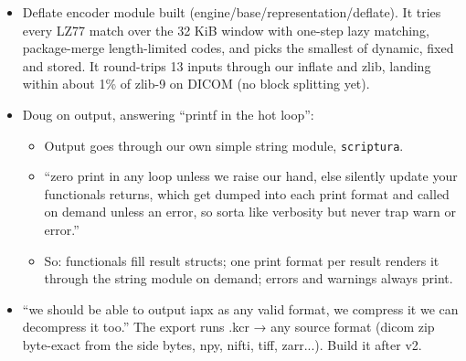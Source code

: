 \begin{itemize}
\begin{itemize}
\begin{enumerate}
\item the head (13 words) with its CRC-64;
\item the offsets and limbs with their CRC-64;
\item the deflated side bytes with a CRC-64 of the inflated bytes;
\item the member tables and names with their CRC-64;
\item EOF.
\end{enumerate}
\item engine\_\allowbreak{}iapx\_\allowbreak{}load takes an optional EngineSideBytes *side (the headers are passed back, and lane\_\allowbreak{}offset rides in it); engine\_\allowbreak{}side\_\allowbreak{}release frees it.
\item Names for the other apx files (flattened, OAPX history, BAPX bodies, IMP key) are still open with Doug. .kfc/.kst/.kgr/.ksd were offered; .ans is for the answer file.
\item The code identifiers still say iapx (engine\_\allowbreak{}iapx\_\allowbreak{}*, iapx\_\allowbreak{}path); rename them to crystal.
\end{itemize}
\item Deflate encoder module built (engine/base/representation/deflate). It tries every LZ77 match over the 32 KiB window with one-step lazy matching, package-merge length-limited codes, and picks the smallest of dynamic, fixed and stored. It round-trips 13 inputs through our inflate and zlib, landing within about 1\% of zlib-9 on DICOM (no block splitting yet).
\item Doug on output, answering “printf in the hot loop”:

\begin{itemize}
\item Output goes through our own simple string module, \texttt{scriptura}.
\item “zero print in any loop unless we raise our hand, else silently update your functionals returns, which get dumped into each print format and called on demand unless an error, so sorta like verbosity but never trap warn or error.”
\item So: functionals fill result structs; one print format per result renders it through the string module on demand; errors and warnings always print.
\end{itemize}
\item “we should be able to output iapx as any valid format, we compress it we can decompress it too.” The export runs .kcr → any source format (dicom zip byte-exact from the side bytes, npy, nifti, tiff, zarr...). Build it after v2.
\end{itemize}

